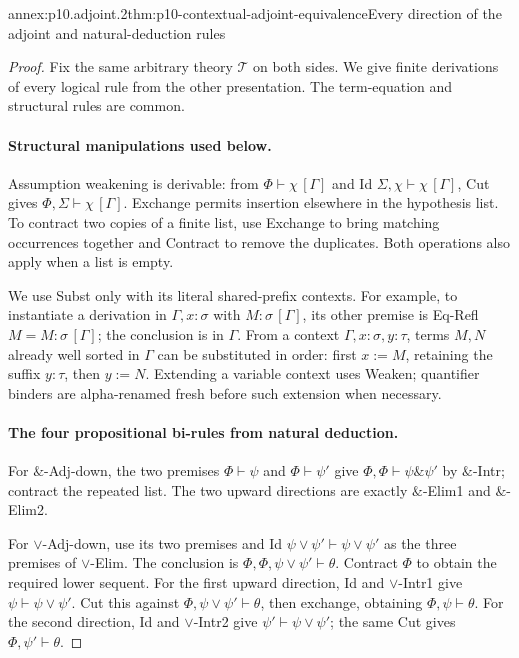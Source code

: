 \begin{annexitem}{annex:p10.adjoint.2}{thm:p10-contextual-adjoint-equivalence}{Every direction of the adjoint and natural-deduction rules}
\begin{proof}
Fix the same arbitrary theory \(\mathcal T\) on both sides.
We give finite derivations of every logical rule from the other
presentation. The term-equation and structural rules are common.

\paragraph{Structural manipulations used below.}
Assumption weakening is derivable: from
\(\Phi\vdash\chi\,[\Gamma]\) and Id
\(\Sigma,\chi\vdash\chi\,[\Gamma]\), Cut gives
\(\Phi,\Sigma\vdash\chi\,[\Gamma]\).
Exchange permits insertion elsewhere in the hypothesis list.
To contract two copies of a finite list, use Exchange to bring
matching occurrences together and Contract to remove the duplicates.
Both operations also apply when a list is empty.

We use Subst only with its literal shared-prefix contexts.
For example, to instantiate a derivation in \(\Gamma,x:\sigma\)
with \(M:\sigma\,[\Gamma]\), its other premise is Eq-Refl
\(M=M:\sigma\,[\Gamma]\); the conclusion is in \(\Gamma\).
From a context \(\Gamma,x:\sigma,y:\tau\), terms \(M,N\)
already well sorted in \(\Gamma\) can be substituted in order:
first \(x:=M\), retaining the suffix \(y:\tau\), then \(y:=N\).
Extending a variable context uses Weaken; quantifier binders are
alpha-renamed fresh before such extension when necessary.

\paragraph{The four propositional bi-rules from natural deduction.}
For \(\&\)-Adj-down, the two premises
\(\Phi\vdash\psi\) and \(\Phi\vdash\psi'\) give
\(\Phi,\Phi\vdash\psi\mathbin{\&}\psi'\) by
\(\&\)-Intr; contract the repeated list.
The two upward directions are exactly \(\&\)-Elim1 and
\(\&\)-Elim2.

For \(\vee\)-Adj-down, use its two premises and Id
\(\psi\vee\psi'\vdash\psi\vee\psi'\) as the three premises
of \(\vee\)-Elim. The conclusion is
\(\Phi,\Phi,\psi\vee\psi'\vdash\theta\).
Contract \(\Phi\) to obtain the required lower sequent.
For the first upward direction, Id and \(\vee\)-Intr1 give
\(\psi\vdash\psi\vee\psi'\). Cut this against
\(\Phi,\psi\vee\psi'\vdash\theta\), then exchange, obtaining
\(\Phi,\psi\vdash\theta\).
For the second direction, Id and \(\vee\)-Intr2 give
\(\psi'\vdash\psi\vee\psi'\); the same Cut gives
\(\Phi,\psi'\vdash\theta\).


\end{proof}
\end{annexitem}
